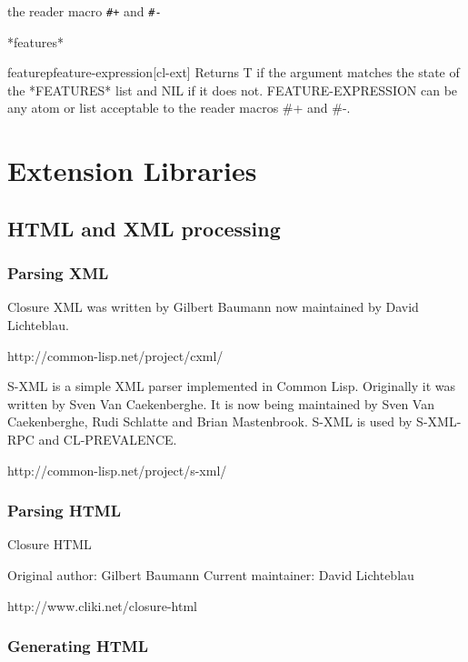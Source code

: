\documentclass[10pt,english]{book}
\begin{document}
the reader macro \texttt{\#+} and \texttt{\#-}

\begin{variable}{*features*}{}
  
\end{variable}

\begin{function}{featurep}{feature-expression}[cl-ext]
  Returns T if the argument matches the state of the *FEATURES*
list and NIL if it does not. FEATURE-EXPRESSION can be any atom
or list acceptable to the reader macros \#+ and \#-.
\end{function}

\part{Extension Libraries}
\label{part:libraries}


\chapter{HTML and XML processing}
\label{cha:html-xml-processing}

\section{Parsing XML}
\label{sec:parsing-xml}

Closure XML was written by Gilbert Baumann now maintained by David
Lichteblau. 

http://common-lisp.net/project/cxml/

S-XML is a simple XML parser implemented in Common Lisp. Originally it
was written by Sven Van Caekenberghe. It is now being maintained by
Sven Van Caekenberghe, Rudi Schlatte and Brian Mastenbrook. S-XML is
used by S-XML-RPC and CL-PREVALENCE.

http://common-lisp.net/project/s-xml/

\section{Parsing HTML}
\label{sec:parsing-html}

Closure HTML

Original author: Gilbert Baumann
Current maintainer: David Lichteblau 

http://www.cliki.net/closure-html


\section{Generating HTML}
\label{sec:generating-html}
\end{document}
